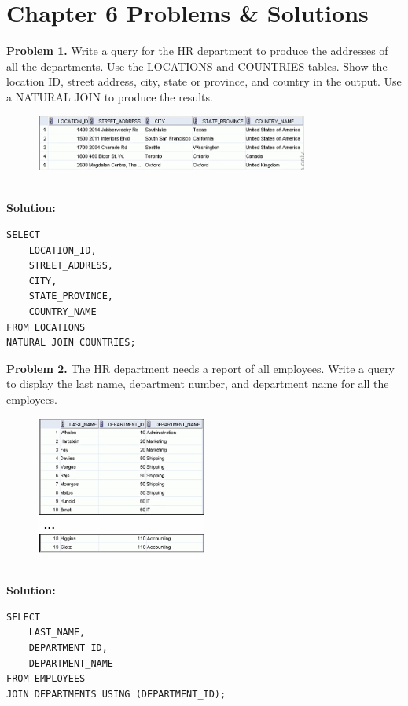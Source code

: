 \documentclass[12pt,a4paper]{article}
\begin{document}
\newpage

\section{Chapter 6 Problems \& Solutions}

\textbf{Problem 1.} Write a query for the HR department to produce the addresses of all the departments. Use the LOCATIONS and COUNTRIES tables. Show the location ID, street address, city, state or province, and country in the output. Use a NATURAL JOIN to produce the results.
\begin{figure}[htbp]
  \centering
  \includegraphics[width=0.8\textwidth]{Screenshots/61.png}
\end{figure}\\
\textbf{Solution:}
\begin{lstlisting}[style=sqlstyle]
SELECT 
    LOCATION_ID,
    STREET_ADDRESS,
    CITY,
    STATE_PROVINCE,
    COUNTRY_NAME
FROM LOCATIONS
NATURAL JOIN COUNTRIES;
\end{lstlisting}

\vspace{0.5cm}

\textbf{Problem 2.} The HR department needs a report of all employees. Write a query to display the last name, department number, and department name for all the employees.
\begin{figure}[htbp]
  \centering
  \includegraphics[width=0.5\textwidth]{Screenshots/62.png}
\end{figure}\\
\textbf{Solution:}
\begin{lstlisting}[style=sqlstyle]
SELECT 
    LAST_NAME,
    DEPARTMENT_ID,
    DEPARTMENT_NAME
FROM EMPLOYEES
JOIN DEPARTMENTS USING (DEPARTMENT_ID);
\end{lstlisting}
\end{document}
